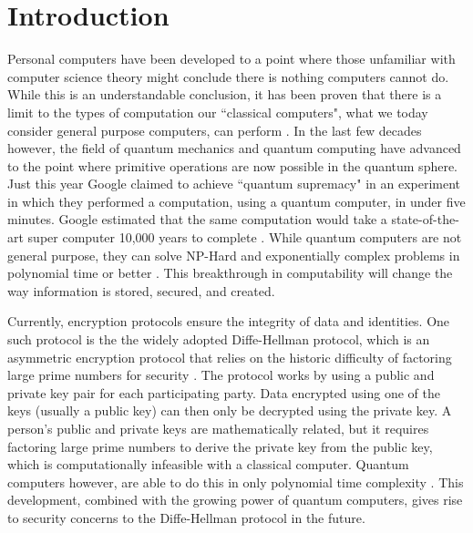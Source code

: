 \chapter{Introduction}
\label{chap:introduction}

Personal computers have been developed to a point where those unfamiliar with computer science theory might conclude there is nothing computers cannot do.
While this is an understandable conclusion, it has been proven that there is a limit to the types of computation our ``classical computers", what we today consider general purpose computers, can perform \cite{linz}.
In the last few decades however, the field of quantum mechanics and quantum computing have advanced to the point where primitive operations are now possible in the quantum sphere.
Just this year Google claimed to achieve ``quantum supremacy" in an experiment in which they performed a computation, using a quantum computer, in under five minutes. 
Google estimated that the same computation would take a state-of-the-art super computer 10,000 years to complete \cite{quantum_supremacy}. 
While quantum computers are not general purpose, they can solve NP-Hard and exponentially complex problems in polynomial time or better \cite{MikeAndIke}.
This breakthrough in computability will change the way information is stored, secured, and created.


Currently, encryption protocols ensure the integrity of data and identities.
One such protocol is the the widely adopted Diffe-Hellman protocol, which is an asymmetric encryption protocol that relies on the historic difficulty of factoring large prime numbers for security \cite{qc:agi}.
The protocol works by using a public and private key pair for each participating party.
Data encrypted using one of the keys (usually a public key) can then only be decrypted using the private key.
A person's public and private keys are mathematically related, but it requires factoring large prime numbers to derive the private key from the public key, which is computationally infeasible with a classical computer.
Quantum computers however, are able to do this in only polynomial time complexity \cite{doi:10.1137/S0036144598347011}.
This development, combined with the growing power of quantum computers, gives rise to security concerns to the Diffe-Hellman protocol in the future.

